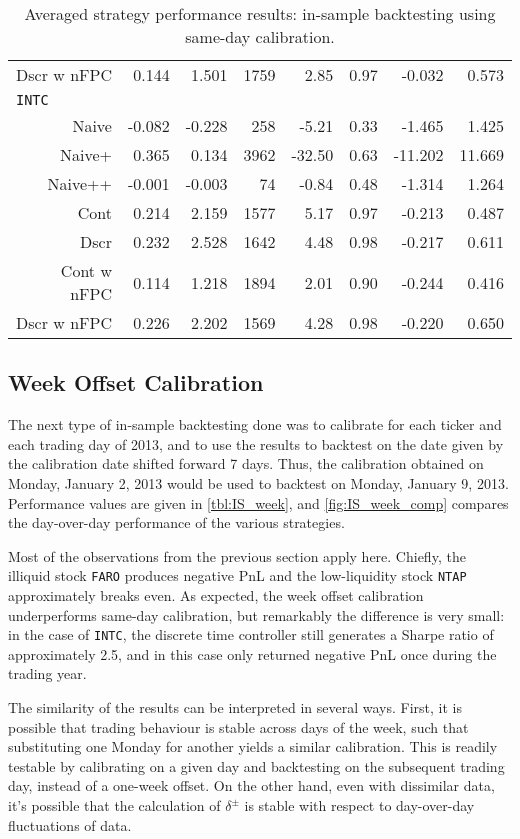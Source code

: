 \begin{table}
\begin{tabular}{@{} *{8}{r} @{}}
Dscr w nFPC & 0.144 & 1.501 & 1759 & 2.85 & 0.97 & -0.032 & 0.573 \\[2ex]
\multicolumn{8}{l}{\texttt{INTC}} \\
Naive & -0.082 & -0.228 & 258 & -5.21 & 0.33 & -1.465 & 1.425 \\ 
Naive+ & 0.365 & 0.134 & 3962 & -32.50 & 0.63 & -11.202 & 11.669 \\ 
Naive++ & -0.001 & -0.003 & 74 & -0.84 & 0.48 & -1.314 & 1.264 \\ 
Cont & 0.214 & 2.159 & 1577 & 5.17 & 0.97 & -0.213 & 0.487 \\ 
Dscr & 0.232 & 2.528 & 1642 & 4.48 & 0.98 & -0.217 & 0.611 \\ 
Cont w nFPC & 0.114 & 1.218 & 1894 & 2.01 & 0.90 & -0.244 & 0.416 \\ 
Dscr w nFPC &  0.226 & 2.202 & 1569 & 4.28 & 0.98 & -0.220 & 0.650 \\ 
\bottomrule
\end{tabular}
\caption{Averaged strategy performance results: in-sample backtesting using same-day calibration.}
\label{tbl:IS_sameday}
\end{table}

\FloatBarrier
\subsection{Week Offset Calibration}
The next type of in-sample backtesting done was to calibrate for each ticker and each trading day of 2013, and to use the results to backtest on the date given by the calibration date shifted forward 7 days. Thus, the calibration obtained on Monday, January 2, 2013 would be used to backtest on Monday, January 9, 2013. Performance values are given in \autoref{tbl:IS_week}, and \autoref{fig:IS_week_comp} compares the day-over-day performance of the various strategies. 

Most of the observations from the previous section apply here. Chiefly, the illiquid stock \texttt{FARO} produces negative PnL and the low-liquidity stock \texttt{NTAP} approximately breaks even. As expected, the week offset calibration underperforms same-day calibration, but remarkably the difference is very small: in the case of \texttt{INTC}, the discrete time controller still generates a Sharpe ratio of approximately 2.5, and in this case only returned negative PnL once during the trading year. 

The similarity of the results can be interpreted in several ways. First, it is possible that trading behaviour is stable across days of the week, such that substituting one Monday for another yields a similar calibration. This is readily testable by calibrating on a given day and backtesting on the subsequent trading day, instead of a one-week offset. On the other hand, even with dissimilar data, it's possible that the calculation of $\delta^\pm$ is stable with respect to day-over-day fluctuations of data.

